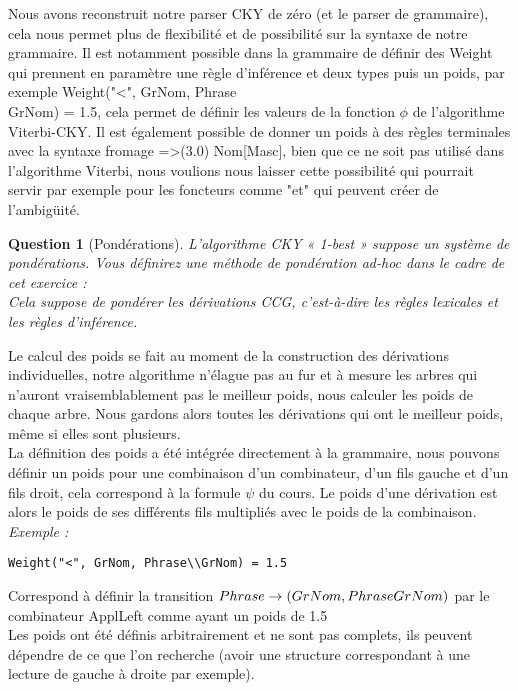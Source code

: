 \documentclass[12pt]{article}
\theoremstyle{exostyle}
\newtheorem{exo}{Question}[section]
\begin{document}
Nous avons reconstruit notre parser CKY de zéro (et le parser de grammaire), cela nous permet plus de flexibilité et de possibilité sur la syntaxe de notre grammaire. Il est notamment possible dans la grammaire de définir des Weight qui prennent en paramètre une règle d'inférence et deux types puis un poids, par exemple Weight("<", GrNom, Phrase\\GrNom) = 1.5, cela permet de définir les valeurs de la fonction $\phi$ de l'algorithme Viterbi-CKY. Il est également possible de donner un poids à des règles terminales avec la syntaxe fromage =>(3.0) Nom[Masc], bien que ce ne soit pas utilisé dans l'algorithme Viterbi, nous voulions nous laisser cette possibilité qui pourrait servir par exemple pour les foncteurs comme "et" qui peuvent créer de l'ambigüité.

\begin{exo}[Pondérations]
\textit{L’algorithme CKY « 1-best » suppose un système de pondérations. Vous
définirez une méthode de pondération ad-hoc dans le cadre de cet exercice :\\
Cela suppose de pondérer les dérivations CCG, c’est-à-dire les règles
lexicales et les règles d’inférence.}
\end{exo}

Le calcul des poids se fait au moment de la construction des dérivations individuelles, notre algorithme n'élague pas au fur et à mesure les arbres qui n'auront vraisemblablement pas le meilleur poids, nous calculer les poids de chaque arbre. Nous gardons alors toutes les dérivations qui ont le meilleur poids, même si elles sont plusieurs.\\
La définition des poids a été intégrée directement à la grammaire, nous pouvons définir un poids pour une combinaison d'un combinateur, d'un fils gauche et d'un fils droit, cela correspond à la formule $\psi$ du cours. Le poids d'une dérivation est alors le poids de ses différents fils multipliés avec le poids de la combinaison.\\
\textit{Exemple :}
\begin{verbatim}
Weight("<", GrNom, Phrase\\GrNom) = 1.5
\end{verbatim}
Correspond à définir la transition $Phrase \rightarrow (GrNom, Phrase\\GrNom)$ par le combinateur ApplLeft comme ayant un poids de 1.5\\

Les poids ont été définis arbitrairement et ne sont pas complets, ils peuvent dépendre de ce que l'on recherche (avoir une structure correspondant à une lecture de gauche à droite par exemple).
\end{document}
